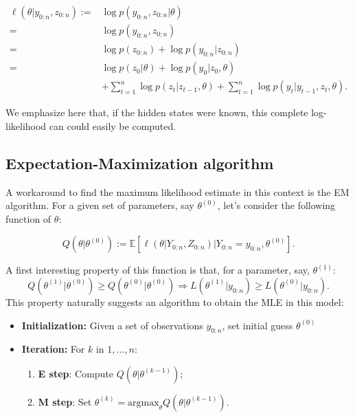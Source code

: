 \documentclass[]{book}
\providecommand{\tightlist}{%
  \setlength{\itemsep}{0pt}\setlength{\parskip}{0pt}}
\begin{document}
\begin{align}
\ell(\theta \vert y_{0:n}, z_{0:n}) :=& \log p(y_{0:n}, z_{0:n} \vert \theta) \nonumber \\
=& \log p(y_{0:n}, z_{0:n}) \nonumber \\
=& \log p(z_{0:n}) + \log p(y_{0:n}\vert z_{0:n}) \nonumber \\
=&  \log p(z_0 \vert \theta) + \log p(y_0\vert z_0, \theta) \nonumber \\ 
&+ \sum_{t = 1}^n \log p(z_{t} \vert z_{t - 1}, \theta) + \sum_{t = 1}^n \log p(y_{t}\vert y_{t -1}, z_{t}, \theta)  \label{eq:AR-HMM-complete-log-likelihood}.
\end{align}

We emphasize here that, if the hidden states were known, this complete
log-likelihood can could easily be computed.

\subsection{Expectation-Maximization
algorithm}\label{expectation-maximization-algorithm}

A workaround to find the maximum likelihood estimate in this context is
the EM algorithm. For a given set of parameters, say \(\theta^{(0)}\),
let's consider the following function of \(\theta\):

\begin{equation}
Q(\theta \vert \theta^{(0)}) := \mathbb{E}[\ell(\theta \vert Y_{0:n}, Z_{0:n}) \vert Y_{0:n} = y_{0:n}, \theta^{(0)}] \label{eq:E-step-function}.
\end{equation}

A first interesting property of this function is that, for a parameter,
say, \(\theta^{(1)}\):
\[Q(\theta^{(1)} \vert \theta^{(0)}) \geq Q(\theta^{(0)} \vert \theta^{(0)}) \Rightarrow L(\theta^{(1)} \vert y_{0:n}) \geq L(\theta^{(0)} \vert y_{0:n}).\]
This property naturally suggests an algorithm to obtain the MLE in this
model:

\begin{itemize}
\tightlist
\item
  \textbf{Initialization:} Given a set of observations \(y_{0:n}\), set
  initial guess \(\theta^{(0)}\)
\item
  \textbf{Iteration:} For \(k\) in \(1,\dots, n\):

  \begin{enumerate}
  \def\labelenumi{\arabic{enumi}.}
  \tightlist
  \item
    \textbf{E step}: Compute \(Q(\theta \vert \theta^{(k-1)})\);
  \item
    \textbf{M step}: Set
    \(\theta^{(k)} = \text{argmax}_\theta Q(\theta \vert \theta^{(k-1)})\).
  \end{enumerate}
\end{itemize}
\end{document}
